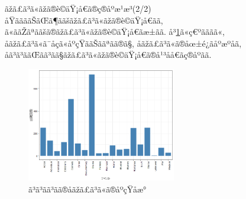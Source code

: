 \documentclass[dvipdfmx]{beamer} %
\newcommand{\backupend}{
\addtocounter{framenumberappendix}{-\value{framenumber}}
\addtocounter{framenumber}{\value{framenumberappendix}}
}
\begin{document}
\begin{frame}{ãžã£ã³ã«ãžã®è©äŸ¡å€ã®ç®åºæ¹æ³(2/2)}
åŸããããŠãŒã¶ããšãžã£ã³ã«ãžã®è©äŸ¡å€ãã, ã«ããŽãªããšã®ãžã£ã³ã«ãžã®è©äŸ¡å€ãæ±ãã. å³\ref{genre_count}ã«ç€ºãããã«, åãžã£ã³ã«ã¯åç­ã«åºçŸããŠããªãã®ã§, åãžã£ã³ã«ã®åœ±é¿ãåºæºåã, åã³ã³ããŒãã³ãã§ãžã£ã³ã«ãžã®è©äŸ¡å€ã®å¹³åå€ãç®åºãã.

\vspace{0.2cm}
\begin{figure}[htbp]
\begin{center}
\includegraphics[clip,height= 50mm]{data/genre_count.png}
\end{center}
\caption{ã³ã³ãã³ãã®åãžã£ã³ã«ã®åºçŸåæ°}
\label{genre_count}
\end{figure}
\end{frame}
	
\backupend
\end{document}
